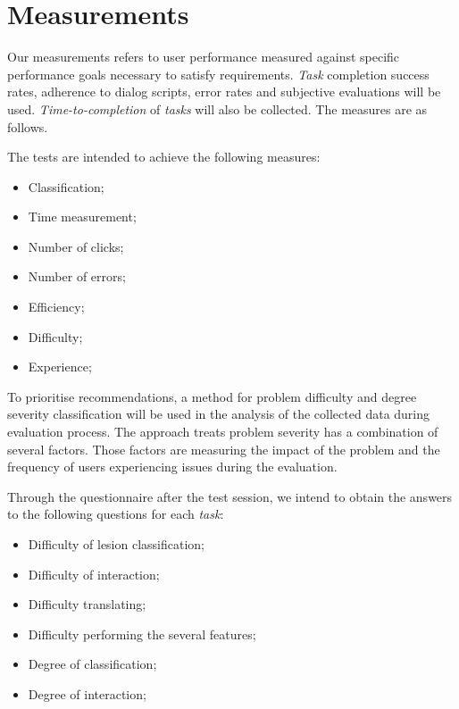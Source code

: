 \section{Measurements}

Our measurements refers to user performance measured against specific performance goals necessary to satisfy requirements. \textit{Task} completion success rates, adherence to dialog scripts, error rates and subjective evaluations will be used. \textit{Time-to-completion} of \textit{tasks} will also be collected. The measures are as follows.

\hfill


The tests are intended to achieve the following measures:


\hfill

\begin{itemize}
\item Classification;
\item Time measurement;
\item Number of clicks;
\item Number of errors;
\item Efficiency;
\item Difficulty;
\item Experience;
\end{itemize}

\hfill


To prioritise recommendations, a method for problem difficulty and degree severity classification will be used in the analysis of the collected data during evaluation process. The approach treats problem severity has a combination of several factors. Those factors are measuring the impact of the problem and the frequency of users experiencing issues during the evaluation.

\hfill


Through the questionnaire after the test session, we intend to obtain the answers to the following questions for each \textit{task}:


\hfill

\begin{itemize}
\item Difficulty of lesion classification;
\item Difficulty of interaction;
\item Difficulty translating;
\item Difficulty performing the several features;
\item Degree of classification;
\item Degree of interaction;
\end{itemize}

\hfill

